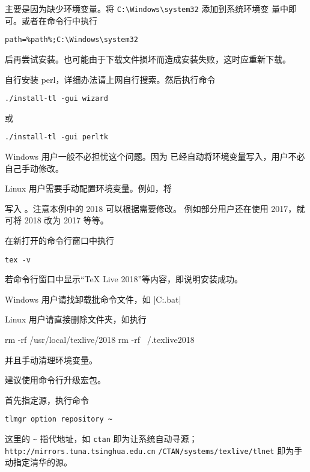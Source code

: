主要是因为缺少环境变量。将 \verb|C:\Windows\system32| 添加到系统环境变
量中即可。或者在命令行中执行
\begin{verbatim}
path=%path%;C:\Windows\system32
\end{verbatim}
后再尝试安装。也可能由于下载文件损坏而造成安装失败，这时应重新下载。



自行安装 perl，详细办法请上网自行搜索。然后执行命令
\begin{verbatim}
./install-tl -gui wizard
\end{verbatim}
或
\begin{verbatim}
./install-tl -gui perltk
\end{verbatim}



Windows 用户一般不必担忧这个问题。因为 \TeXLive{} 已经自动将环境变量写入，用户不必自己手动修改。

Linux 用户需要手动配置环境变量。例如，将
写入 。注意本例中的 2018 可以根据需要修改。
例如部分用户还在使用 \TeXLive{} 2017，就可将 2018 改为 2017 等等。



在新打开的命令行窗口中执行
\begin{verbatim}
tex -v
\end{verbatim}
若命令行窗口中显示“TeX Live 2018”等内容，即说明安装成功。



Windows 用户请找卸载批命令文件，如 |C:\texlive{}\tlpkg\installer\uninst.bat|

Linux 用户请直接删除文件夹，如执行
\begin{shcode}
  rm -rf /usr/local/texlive/2018
  rm -rf ~/.texlive2018
\end{shcode}
并且手动清理环境变量。


建议使用命令行升级宏包。

首先指定源，执行命令
\begin{verbatim}
tlmgr option repository ~
\end{verbatim}
这里的 \verb|~| 指代地址，如 \verb|ctan| 即为让系统自动寻源；
\verb|http://mirrors.tuna.tsinghua.edu.cn| 
\verb|/CTAN/systems/texlive/tlnet| 即为手动指定清华的源。

